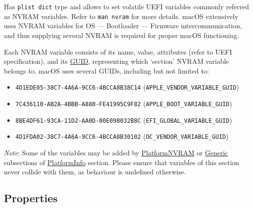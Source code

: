 \documentclass[]{article}
\makeatletter
\providecommand{\tightlist}{%
  \setlength{\itemsep}{0pt}\setlength{\parskip}{0pt}}
\renewcommand{\label}[1]{%
\zref@wrapper@immediate{\oldlabel{#1}}}  %
\makeatother
\begin{document}
Has \texttt{plist\ dict} type and allows to set volatile UEFI variables
commonly referred as NVRAM variables. Refer to \texttt{man\ nvram} for
more details. macOS extensively uses NVRAM variables for OS --- Bootloader
--- Firmware intercommunication, and thus supplying several NVRAM is
required for proper macOS functioning.

Each NVRAM variable consists of its name, value, attributes (refer to
UEFI specification), and its
\href{https://en.wikipedia.org/wiki/Universally_unique_identifier}{GUID},
representing which `section' NVRAM variable belongs to. macOS uses
several GUIDs, including but not limited to:

\begin{itemize}
\tightlist
\item
  \texttt{4D1EDE05-38C7-4A6A-9CC6-4BCCA8B38C14}
  (\texttt{APPLE\_VENDOR\_VARIABLE\_GUID})
\item
  \texttt{7C436110-AB2A-4BBB-A880-FE41995C9F82}
  (\texttt{APPLE\_BOOT\_VARIABLE\_GUID})
\item
  \texttt{8BE4DF61-93CA-11D2-AA0D-00E098032B8C}
  (\texttt{EFI\_GLOBAL\_VARIABLE\_GUID})
\item
  \texttt{4D1FDA02-38C7-4A6A-9CC6-4BCCA8B30102}
  (\texttt{OC\_VENDOR\_VARIABLE\_GUID})
\end{itemize}

\emph{Note}: Some of the variables may be added by
\hyperref[platforminfonvram]{PlatformNVRAM} or
\hyperref[platforminfogeneric]{Generic} subsections of
\hyperref[platforminfo]{PlatformInfo} section.
Please ensure that variables of this section never collide with them,
as behaviour is undefined otherwise.

\subsection{Properties}\label{nvramprops}
\end{document}
